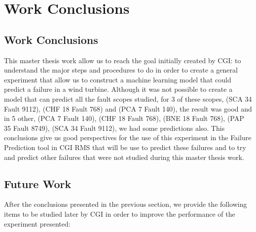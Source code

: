

\chapter{Work Conclusions}
\label{cha:Work Conclusions}

\section{Work Conclusions}
\label{sub:Work Conclusions/Work Conclusions}
This master thesis work allow us to reach the goal initially created by CGI: to understand the major steps and procedures to do in order to create a general experiment that allow us to construct a machine learning model that could predict a failure in a wind turbine. Although it was not possible to create a model that can predict all the fault scopes studied, for 3 of these scopes, (SCA 34 Fault 9112), (CHF 18 Fault 768) and (PCA 7 Fault 140), the result was good and in 5 other, (PCA 7 Fault 140), (CHF 18 Fault 768), (BNE 18 Fault 768), (PAP 35 Fault 8749), (SCA 34 Fault 9112), we had some predictions also. This conclusions give us good perspectives for the use of this experiment in the Failure Prediction tool in CGI RMS that will be use to predict these failures and to try and predict other failures that were not studied during this master thesis work.

\section{Future Work}
\label{sub:Work Conclusions/Future Work}
After the conclusions presented in the previous section, we provide the following items to be studied later by CGI in order to improve the performance of the experiment presented:


